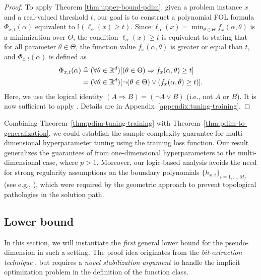 \documentclass{article}
\theoremstyle{plain}
\theoremstyle{definition}
\theoremstyle{remark}
\begin{document}
\begin{proof}
    To apply Theorem \ref{thm:upper-bound-pdim}, given a problem instance $x$ and a real-valued threshold $t$, our goal is to construct a polynomial FOL formula $\Phi_{x, t}(\alpha)$ equivalent to $\mathbb{I}(\ell_\alpha(x) \geq t)$. Since $\ell_\alpha(x) = \min_{\theta \in \Theta} f_x(\alpha, \theta)$ is a minimization over $\Theta$, the condition $\ell_\alpha(x) \geq t$ is equivalent to stating that for all parameter $\theta \in \Theta$, the function value $f_x(\alpha, \theta)$ is greater or equal than $t$, and $\Phi_{x, t}(\alpha)$ is defined as
    \begin{equation*}
        \begin{aligned}
            \Phi_{x, t}(\alpha) &\triangleq (\forall \theta \in \mathbb{R}^d)[(\theta \in \Theta) \Rightarrow f_x(\alpha, \theta) \geq t] \\
            &= (\forall \theta \in \mathbb{R}^d)[\neg (\theta \in \Theta) \lor (f_x(\alpha, \theta) \geq t)].
        \end{aligned}
    \end{equation*}
    Here, we use the logical identity $(A \Rightarrow B) =  (\neg A \lor B)$ (i.e., not $A$ or $B$). It is now sufficient to apply . Details are in Appendix~\ref{appendix:tuning-training}.
\end{proof}


Combining Theorem~\ref{thm:pdim-tuning-training} with Theorem~\ref{thm:pdim-to-generalization}, we could establish the sample complexity guarantee for multi-dimensional hyperparameter tuning using the training loss function. Our result generalizes the guarantees of \citet{balcan2025sample} from one-dimensional hyperparameters to the multi-dimensional case, where $p > 1$. Moreover, our logic-based analysis avoids the need for strong regularity assumptions on the boundary polynomials $\{h_{x, i}\}_{i = 1, \dots, M_f}$ (see e.g., \citet[Assumption 1]{balcan2025sample}), which were required by the geometric approach to prevent topological pathologies in the solution path. 


    \subsection{Lower bound}
    In this section, we will instantiate the \textit{first} general lower bound for the pseudo-dimension in such a setting. The proof idea originates from the \textit{bit-extraction technique} \citep{bartlett2019nearly}, but requires a \textit{novel stabilization argument} to handle the implicit optimization problem in the definition of the function class. 
\end{document}
